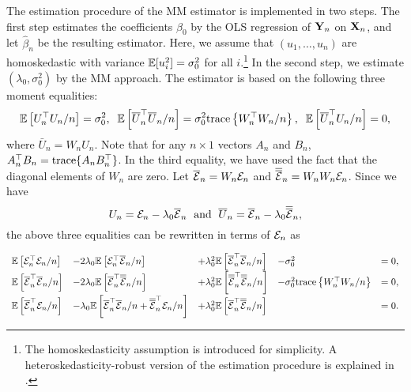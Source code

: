 \documentclass[11pt, A4paper, openany, uplatex]{book}
\begin{document}
The estimation procedure of the MM estimator is implemented in two steps.
The first step estimates the coefficients $\beta_0$ by the OLS regression of $\mathbf{Y}_n$ on $\mathbf{X}_n$, and let $\hat \beta_n$ be the resulting estimator.
Here, we assume that $(u_1, \ldots , u_n)$ are homoskedastic with variance $\mathbb{E}[u_i^2] = \sigma_0^2$ for all $i$.\footnote{
	The homoskedasticity assumption is introduced for simplicity.
	A heteroskedasticity-robust version of the estimation procedure is explained in \cite{kelejian2010specification}.
}
In the second step, we estimate $(\lambda_0, \sigma_0^2)$ by the MM approach.
The estimator is based on the following three moment equalities: 
\begin{align*}
	\mathbb{E}\left[ U_n^\top U_n /n \right] = \sigma_0^2, \;\; \mathbb{E}\left[ \overline U_n^\top \overline U_n /n \right] =  \sigma_0^2  \mathrm{trace}\left\{ W_n^\top W_n/n \right\}, \;\;  \mathbb{E}\left[ \overline U_n^\top U_n/n \right] = 0,
\end{align*}
where $\bar U_n = W_n U_n$.
Note that for any $n \times 1$ vectors $A_n$ and $B_n$, $A_n^\top B_n = \mathrm{trace}\{ A_n B_n^\top \}$.
In the third equality, we have used the fact that the diagonal elements of $W_n$ are zero.
Let $\overline{\mathcal{E}}_n = W_n \mathcal{E}_n$ and $\overline{\overline{\mathcal{E}}}_n = W_n W_n \mathcal{E}_n$.
Since we have
\[
	U_n = \mathcal{E}_n - \lambda_0 \overline{\mathcal{E}}_n\; \text{ and }\; \overline U_n = \overline{\mathcal{E}}_n - \lambda_0 \overline{\overline{\mathcal{E}}}_n,
\]
 the above three equalities can be rewritten in terms of $\mathcal{E}_n$ as
\begin{align*}\renewcommand{\arraystretch}{1.8}
\begin{array}{lllll}
	\E\left[ \mcl{E}_n^\top \mcl{E}_n /n\right] 
	& - 2\lambda_0 \E\left[ \mcl{E}_n^\top \bar{\mcl{E}}_n/n \right] 
	& +  \lambda^2_0 \E\left[ \bar{\mcl{E}}_n^\top \bar{\mcl{E}}_n/n \right] 
	& - \sigma^2_0 
	& = 0,\\
	\E\left[ \bar{\mcl{E}}_n^\top \bar{\mcl{E}}_n/n \right] 
	& - 2\lambda_0 \E\left[ \bar{\mcl{E}}_n^\top \bar{\bar{\mcl{E}}}_n/n \right] 
	& +  \lambda^2_0 \E\left[ \bar{\bar{\mcl{E}}}_n^\top \bar{\bar{\mcl{E}}}_n/n \right] 
	& - \sigma^2_0 \mrm{trace}\left\{ W_n^\top W_n/n \right\} 
	& = 0, \\
	\E\left[ \bar{\mcl{E}}_n^\top \mcl{E}_n/n \right] 
	& - \lambda_0 \E\left[ \bar{\mcl{E}}_n^\top \bar{\mcl{E}}_n/n + \bar{\bar{\mcl{E}}}_n^\top \mcl{E}_n/n\right] 
	& +  \lambda^2_0 \E\left[ \bar{\mcl{E}}_n^\top \bar{\bar{\mcl{E}}}_n/n \right]  
	&
	& = 0.
\end{array}
\end{align*}
\end{document}
